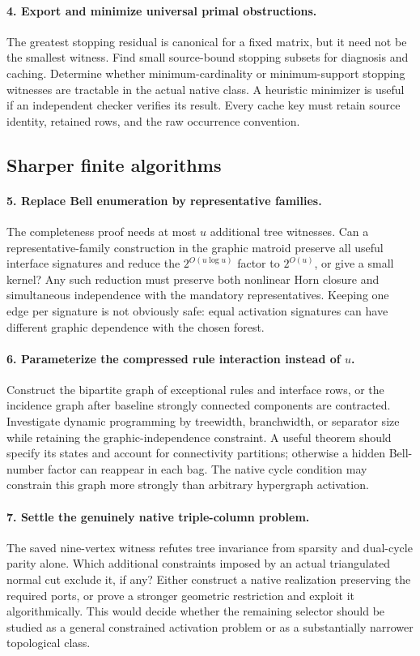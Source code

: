 \paragraph{4. Export and minimize universal primal obstructions.}
The greatest stopping residual is canonical for a fixed matrix, but it
need not be the smallest witness.  Find small source-bound stopping
subsets for diagnosis and caching.  Determine whether minimum-cardinality
or minimum-support stopping witnesses are tractable in the actual native
class.  A heuristic minimizer is useful if an independent checker verifies
its result.  Every cache key must retain source identity, retained rows,
and the raw occurrence convention.

\subsection{Sharper finite algorithms}

\paragraph{5. Replace Bell enumeration by representative families.}
The completeness proof needs at most $u$ additional tree witnesses.
Can a representative-family construction in the graphic matroid preserve
all useful interface signatures and reduce the $2^{O(u\log u)}$ factor
to $2^{O(u)}$, or give a small kernel?  Any such reduction must preserve
both nonlinear Horn closure and simultaneous independence with the
mandatory representatives.  Keeping one edge per signature is not
obviously safe: equal activation signatures can have different graphic
dependence with the chosen forest.

\paragraph{6. Parameterize the compressed rule interaction instead of $u$.}
Construct the bipartite graph of exceptional rules and interface rows,
or the incidence graph after baseline strongly connected components are
contracted.  Investigate dynamic programming by treewidth, branchwidth,
or separator size while retaining the graphic-independence constraint.
A useful theorem should specify its states and account for connectivity
partitions; otherwise a hidden Bell-number factor can reappear in each
bag.  The native cycle condition may constrain this graph more strongly
than arbitrary hypergraph activation.

\paragraph{7. Settle the genuinely native triple-column problem.}
The saved nine-vertex witness refutes tree invariance from sparsity and
dual-cycle parity alone.  Which additional constraints imposed by an
actual triangulated normal cut exclude it, if any?  Either construct a
native realization preserving the required ports, or prove a stronger
geometric restriction and exploit it algorithmically.  This would decide
whether the remaining selector should be studied as a general constrained
activation problem or as a substantially narrower topological class.

